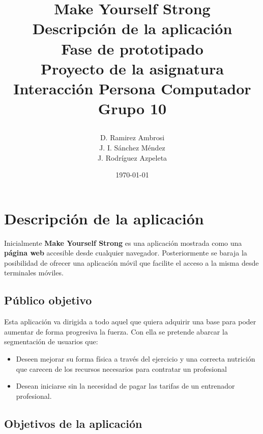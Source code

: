 \documentclass[a4paper]{article}
\date{}
\author{D. Ramirez Ambrosi \\ J. I. Sánchez Méndez \\ J. Rodríguez Azpeleta}
\title{\begin{center}
\textbf{\Huge{Make Yourself Strong}} \\ Descripción de la aplicación \\ Fase de prototipado \\Proyecto de la asignatura Interacción Persona Computador \\ \Huge{Grupo 10}
\end{center}}
\date{\today}
\renewcommand\listfigurename{\centering LISTA DE FIGURAS}
\begin{document}
\maketitle

\thispagestyle{empty}%
\newpage
\tableofcontents%
\thispagestyle{empty}
\newpage





\setcounter{page}{1}%

\section{Descripción de la aplicación}

Inicialmente \textbf{Make Yourself Strong} es una aplicación mostrada como una \textbf{página web} accesible desde cualquier navegador. Posteriormente se baraja la posibilidad de ofrecer una aplicación móvil que facilite el acceso a la misma desde terminales móviles.

\subsection{Público objetivo}
Esta aplicación va dirigida a todo aquel que quiera adquirir una base para poder aumentar de forma progresiva la fuerza. Con ella se pretende abarcar la segmentación de usuarios que:

\begin{itemize}
	\item	Deseen mejorar su forma física a través del ejercicio y una correcta nutrición que carecen de los recursos necesarios para contratar un profesional
	\item	Desean iniciarse sin la necesidad de pagar las tarifas de un entrenador profesional.
\end{itemize}


\subsection{Objetivos de la aplicación}
\end{document}

